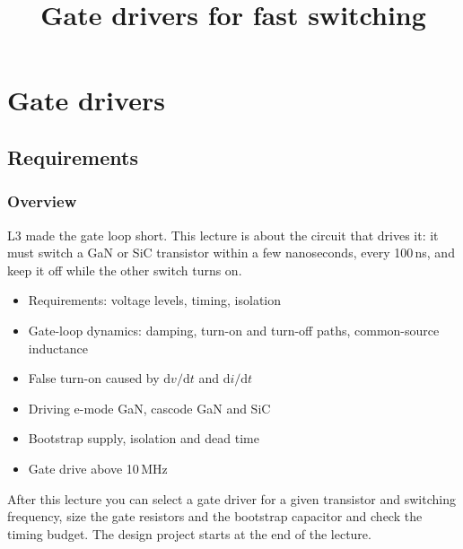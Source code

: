 \title[Gate drivers]{Gate drivers for fast switching}
\section{Gate drivers}

\begin{frame}[plain]
	\titlepage
\end{frame}

\subsection{Requirements}

\begin{frame}
	\frametitle{Overview}
	L3 made the gate loop short. This lecture is about the circuit that drives it: it must switch a GaN or SiC transistor within a few nanoseconds, every 100\,ns, and keep it off while the other switch turns on.
	\begin{itemize}
		\item Requirements: voltage levels, timing, isolation
		\item Gate-loop dynamics: damping, turn-on and turn-off paths, common-source inductance
		\item False turn-on caused by $\mathrm{d}v/\mathrm{d}t$ and $\mathrm{d}i/\mathrm{d}t$
		\item Driving e-mode GaN, cascode GaN and SiC
		\item Bootstrap supply, isolation and dead time
		\item Gate drive above 10\,MHz
	\end{itemize}
	After this lecture you can select a gate driver for a given transistor and switching frequency, size the gate resistors and the bootstrap capacitor and check the timing budget. The design project starts at the end of the lecture.
\end{frame}

